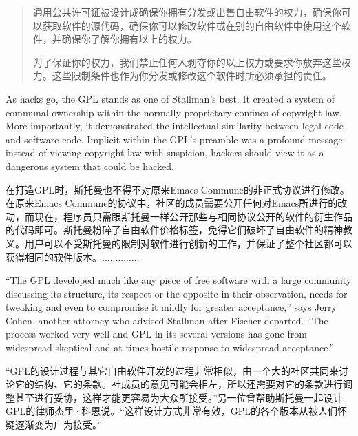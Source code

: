 \ifdefined\chs
\begin{quote}
通用公共许可证被设计成确保你拥有分发或出售自由软件的权力，确保你可以获取软件的源代码，确保你可以修改软件或在别的自由软件中使用这个软件，并确保你了解你拥有以上的权力。

为了保证你的权力，我们禁止任何人剥夺你的以上权力或要求你放弃这些权力。这些限制条件也作为你分发或修改这个软件时所必须承担的责任。

\end{quote}
\fi

\ifdefined\eng
As hacks go, the GPL stands as one of Stallman's best. It created a system of communal ownership within the normally proprietary confines of copyright law. More importantly, it demonstrated the intellectual similarity between legal code and software code. Implicit within the GPL's preamble was a profound message: instead of viewing copyright law with suspicion, hackers should view it as a dangerous system that could be hacked.
\fi

\ifdefined\chs
在打造GPL时，斯托曼也不得不对原来Emacs Commune的非正式协议进行修改。在原来Emacs Commune的协议中，社区的成员需要公开任何对Emacs所进行的改动，而现在，程序员只需跟斯托曼一样公开那些与相同协议公开的软件的衍生作品的代码即可。斯托曼粉碎了自由软件价格标签，免得它们破坏了自由软件的精神教义。用户可以不受斯托曼的限制对软件进行创新的工作，并保证了整个社区都可以获得相同的软件版本。..............
\fi

\ifdefined\eng
``The GPL developed much like any piece of free software with a large community discussing its structure, its respect or the opposite in their observation, needs for tweaking and even to compromise it mildly for greater acceptance,'' says Jerry Cohen, another attorney who advised Stallman after Fischer departed. ``The process worked very well and GPL in its several versions has gone from widespread skeptical and at times hostile response to widespread acceptance.''
\fi

\ifdefined\chs
“GPL的设计过程与其它自由软件开发的过程非常相似，由一个大的社区共同来讨论它的结构、它的条款。社成员的意见可能会相左，所以还需要对它的条款进行调整甚至进行妥协，这样才能更容易为大众所接受。”另一位曾帮助斯托曼一起设计GPL的律师杰里·科恩说。“这样设计方式非常有效，GPL的各个版本从被人们怀疑逐渐变为广为接受。”
\fi

